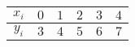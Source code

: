 \begin{tabular}{|c|c|c|c|c|c|}
\hline
$x_{i}$ & $0$ & $1$ & $2$ & $3$ & $4$ \\
\hline
$y_{i}$ & $3$ & $4$ & $5$ & $6$ & $7$ \\
\hline
\end{tabular}
